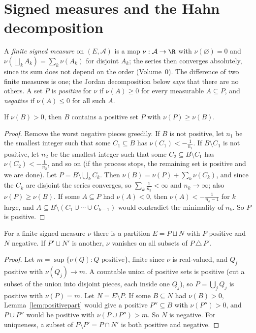 \section{Signed measures and the Hahn decomposition}

A \emph{finite signed measure} on $(E,\mathcal A)$ is a map $\nu:\mathcal A\to\R$ with $\nu(\varnothing)=0$ and $\nu(\bigsqcup_kA_k)=\sum_k\nu(A_k)$ for disjoint $A_k$; the series then converges absolutely, since
its sum does not depend on the order (Volume~0). The difference of two finite measures is one; the Jordan decomposition below says that there are no others. A set $P$ is
\emph{positive} for $\nu$ if $\nu(A)\ge0$ for every measurable $A\subseteq P$, and \emph{negative} if $\nu(A)\le0$ for all such $A$.

\begin{lemma}\label{lem:positivepart}
If $\nu(B)>0$, then $B$ contains a positive set $P$ with $\nu(P)\ge\nu(B)$.
\end{lemma}
\begin{proof}
Remove the worst negative pieces greedily. If $B$ is not positive, let $n_1$ be the smallest integer such that some $C_1\subseteq B$ has $\nu(C_1)<-\frac1{n_1}$. If $B\setminus C_1$ is not positive, let $n_2$ be the
smallest integer such that some $C_2\subseteq B\setminus C_1$ has $\nu(C_2)<-\frac1{n_2}$, and so on (if the process stops, the remaining set is positive and we are done). Let $P=B\setminus\bigcup_kC_k$.
Then $\nu(B)=\nu(P)+\sum_k\nu(C_k)$, and since the $C_k$ are disjoint the series converges, so $\sum_k\frac1{n_k}<\infty$ and $n_k\to\infty$; also $\nu(P)\ge\nu(B)$. If some $A\subseteq P$ had
$\nu(A)<0$, then $\nu(A)<-\frac1{n_k-1}$ for $k$ large, and $A\subseteq B\setminus(C_1\cup\cdots\cup C_{k-1})$ would contradict the minimality of $n_k$. So $P$ is positive.
\end{proof}

\begin{theorem}\label{thm:hahn}
For a finite signed measure $\nu$ there is a partition $E=P\sqcup N$ with $P$ positive and $N$ negative. If $P'\sqcup N'$ is another, $\nu$ vanishes on all subsets of $P\,\triangle\,P'$.
\end{theorem}
\begin{proof}
Let $m=\sup\{\nu(Q):Q\text{ positive}\}$, finite since $\nu$ is real-valued, and $Q_j$ positive with $\nu(Q_j)\to m$. A countable union of positive sets is positive (cut a subset of the union
into disjoint pieces, each inside one $Q_j$), so $P=\bigcup_jQ_j$ is positive with $\nu(P)=m$. Let $N=E\setminus P$. If some $B\subseteq N$ had $\nu(B)>0$, Lemma~\ref{lem:positivepart} would give a positive
$P''\subseteq B$ with $\nu(P'')>0$, and $P\cup P''$ would be positive with $\nu(P\cup P'')>m$. So $N$ is negative. For uniqueness, a subset of $P\setminus P'=P\cap N'$ is both positive and negative.
\end{proof}

